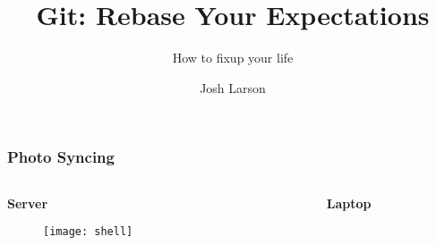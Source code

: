 \documentclass{beamer}
\title{Git: Rebase Your Expectations}
\subtitle{How to fixup your life}
\author{Josh Larson}
\begin{document}
\newcommand{\commit}[3]{
  \node[circle, draw, radius=0.5cm, fill=green](#1) at #2{\Huge \texttt{#3}};
}
\newcommand{\selectedcommit}[3]{
  \node[circle, draw, radius=0.5cm, fill=cyan, very thick](#1) at #2{\Huge \texttt{#3}};
}
\newcommand{\anoncommit}[2]{
  \node[circle, draw, minimum size=1cm, fill=green](#1) at #2{};
}
\newcommand{\selectedanoncommit}[2]{
  \node[circle, draw, minimum size=1cm, fill=green, thick](#1) at #2{};
}
\newcommand{\branch}[3]{
  \node[draw, fill=yellow](#1) at #2{\texttt{#3}};
}
\newcommand{\selectedbranch}[3]{
  \node[draw, fill=yellow, thick](#1) at #2{\texttt{#3}};
}
\newcommand{\textbox}[3]{
  \node(#1)[draw, fill=white, rounded corners, align=left] at #2 {#3};
}
\newcommand{\squiggle}{\~{}}

\titlepage

\begin{frame}
  \newcommand{\photosize}{0.6\textwidth}

  \frametitle{Photo Syncing}

  \begin{columns}
    \begin{column}{0.35\textwidth}
      \begin{center}
        \textbf{Server}
        \begin{figure}[l]  

          \texttt{[image: shell]}

        \end{figure}
      \end{center}
    \end{column}

    \begin{column}{0.3\textwidth}
      \begin{center}
      \end{center}
    \end{column}
    
    \begin{column}{0.35\textwidth}
      \begin{center}
        \textbf{Laptop}
        \begin{figure}


\end{figure}
\end{center}
\end{column}
\end{columns}
\end{frame}
\end{document}
